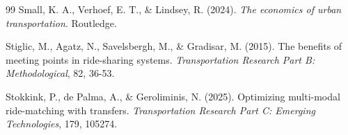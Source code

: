 \documentclass[11pt,a4paper]{article}
\begin{document}
\begin{thebibliography}{99}
 Small, K. A., Verhoef, E. T., \& Lindsey, R. (2024). \textit{The economics of urban transportation}. Routledge.

 Stiglic, M., Agatz, N., Savelsbergh, M., \& Gradisar, M. (2015). The benefits of meeting points in ride-sharing systems. \textit{Transportation Research Part B: Methodological}, 82, 36-53.

 Stokkink, P., de Palma, A., \& Geroliminis, N. (2025). Optimizing multi-modal ride-matching with transfers. \textit{Transportation Research Part C: Emerging Technologies}, 179, 105274.

\end{thebibliography}
\end{document}
